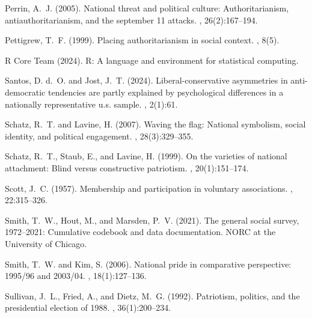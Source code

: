 \documentclass[12pt,letterpaper]{article}
\begin{document}
\begin{thebibliography}{}
Perrin, A.~J. (2005).
\newblock National threat and political culture: Authoritarianism,
  antiauthoritarianism, and the september 11 attacks.
, 26(2):167--194.

Pettigrew, T.~F. (1999).
\newblock Placing authoritarianism in social context.
, 8(5).

{R Core Team} (2024).
\newblock R: A language and environment for statistical computing.

Santos, D. d.~O. and Jost, J.~T. (2024).
\newblock Liberal-conservative asymmetries in anti-democratic tendencies are
  partly explained by psychological differences in a nationally representative
  u.s. sample.
, 2(1):61.

Schatz, R.~T. and Lavine, H. (2007).
\newblock Waving the flag: National symbolism, social identity, and political
  engagement.
, 28(3):329--355.

Schatz, R.~T., Staub, E., and Lavine, H. (1999).
\newblock On the varieties of national attachment: Blind versus constructive
  patriotism.
, 20(1):151--174.

Scott, J.~C. (1957).
\newblock Membership and participation in voluntary associations.
, 22:315--326.

Smith, T.~W., Hout, M., and Marsden, P.~V. (2021).
\newblock The general social survey, 1972--2021: Cumulative codebook and data
  documentation.
\newblock NORC at the University of Chicago.

Smith, T.~W. and Kim, S. (2006).
\newblock National pride in comparative perspective: 1995/96 and 2003/04.
,
  18(1):127--136.

Sullivan, J.~L., Fried, A., and Dietz, M.~G. (1992).
\newblock Patriotism, politics, and the presidential election of 1988.
, 36(1):200--234.


\end{thebibliography}
\end{document}
